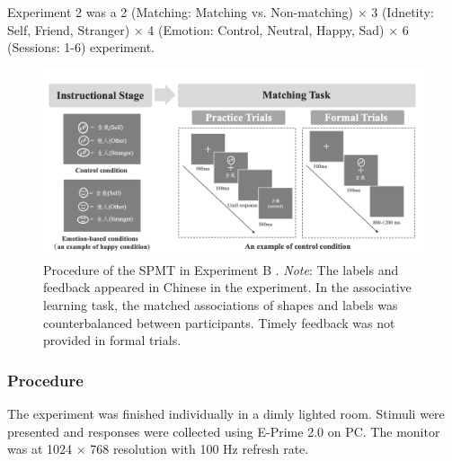 \documentclass[sn-apa]{sn-jnl}%
\theoremstyle{thmstyleone}%
\theoremstyle{thmstyletwo}%
\theoremstyle{thmstylethree}%
\begin{document}
Experiment 2 was a 2 (Matching: Matching vs. Non-matching) × 3 (Idnetity: Self, Friend, Stranger) × 4 (Emotion: Control, Neutral, Happy, Sad) × 6 (Sessions: 1-6) experiment. 

\renewcommand{\thefigure}{S\arabic{figure}} %

\begin{figure}[!ht]
	\centering
	\includegraphics[width=1\textwidth]{./Figure/Fig1_Hu_pro.png}
	\caption[Procedure of the SPMT in Experiment B \parencite{hu2023data}]{	Procedure of the SPMT in Experiment B \parencite{hu2023data}. \textit{Note}: The labels and feedback appeared in Chinese in the experiment. In the associative learning task, the matched associations of shapes and labels was counterbalanced between participants. Timely feedback was not provided in formal trials.}
	\label{fig:Hu_SPMT_procedure}
\end{figure}

\subsubsection{Procedure}\label{subsec:procedure}

The experiment was finished individually in a dimly lighted room. Stimuli were presented and responses were collected using E-Prime 2.0 on PC. The monitor was at 1024 × 768 resolution with 100 Hz refresh rate.
\end{document}
